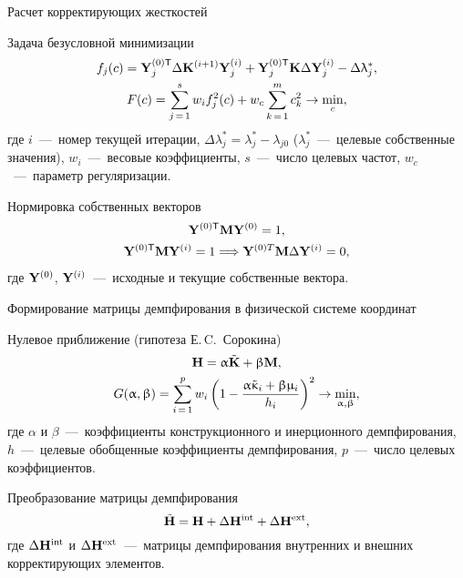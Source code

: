 \begin{frame}{Расчет корректирующих жесткостей}
	\begin{block}{Задача безусловной минимизации}
		\vspace{-1em}
		\begin{gather}
			f_j(c) = \mathbf{Y}_j^{(0)\mathsf{T}} \Delta \mathbf{K}^{(i+1)} \mathbf{Y}_j^{(i)} + \mathbf{Y}_j^{(0)\mathsf{T}} \mathbf{K} \Delta \mathbf{Y}_j^{(i)} - \Delta \uplambda^*_j, \\
			F(c) = \sum \limits_{j\,=\,1}^s w_i f_j^2(c) + w_c \sum \limits_{k\,=\,1}^m c_k^2 \rightarrow \min_{c},
		\end{gather}
		где $ i $~---~номер текущей итерации, $ \Delta \lambda^*_j = \lambda_j^* - \lambda_{j0} $ ($\lambda_j^*$~---~целевые собственные значения), $ w_i $~---~весовые коэффициенты, $ s $~---~число целевых частот, $ w_c $~---~параметр регуляризации.
	\end{block}	
	\begin{block}{Нормировка собственных векторов}
		\vspace{-1em}
		\begin{gather}
			\mathbf{Y}^{(0)\mathsf{T}} \mathbf{M} \mathbf{Y}^{(0)} = 1, \\
			\mathbf{Y}^{(0)\mathsf{T}} \mathbf{M} \mathbf{Y}^{(i)} = 1 \Longrightarrow \mathbf{Y}^{(0)T} \mathbf{M} \Delta \mathbf{Y}^{(i)} = 0,
		\end{gather}
		где $ \mathbf{Y}^{(0)} $, $ \mathbf{Y}^{(i)} $~---~исходные и текущие собственные вектора.
	\end{block}	
\end{frame}

\begin{frame}{Формирование матрицы демпфирования в физической системе координат}
	\begin{block}{Нулевое приближение (гипотеза Е.\,C.~Сорокина)}
		\begin{gather}
			\mathbf{H} = \upalpha \tilde{\mathbf{K}} + \upbeta \mathbf{M}, \\
			G(\upalpha, \upbeta) = \sum\limits_{i\,=\,1}^p w_i \left( 1 - \frac{\upalpha \tilde{\upkappa}_i + \upbeta \upmu_i}{h_i} \right)^2 \rightarrow \min_{\upalpha, \upbeta},
		\end{gather}
		где $ \alpha $ и $ \beta $~---~коэффициенты конструкционного и инерционного демпфирования, $ h $~---~целевые обобщенные коэффициенты демпфирования, $ p $~---~число целевых коэффициентов.
	\end{block}
	\begin{block}{Преобразование матрицы демпфирования} 
 		\begin{equation} 
			\tilde{\mathbf{H}} = \mathbf{H} + \Delta \mathbf{H} ^ {\text{int}} + \Delta \mathbf{H} ^ {\text{ext}},
		\end{equation}
		где $ \Delta \mathbf{H} ^ {\text{int}} $ и $ \Delta \mathbf{H} ^ {\text{ext}} $~---~матрицы демпфирования внутренних и внешних корректирующих элементов. 
	\end{block}
\end{frame}

